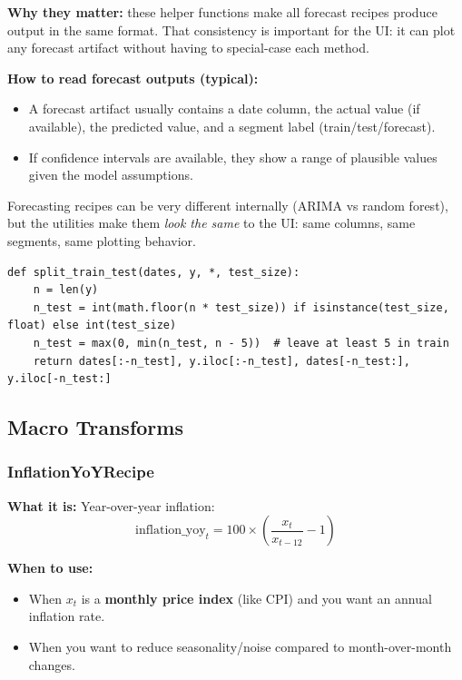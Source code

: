 \documentclass[11pt,a4paper]{article}
\begin{document}
\textbf{Why they matter:} these helper functions make all forecast recipes produce output in the same format. That consistency is important for the UI: it can plot any forecast artifact without having to special-case each method.

\textbf{How to read forecast outputs (typical):}
\begin{itemize}[leftmargin=2em]
  \item A forecast artifact usually contains a date column, the actual value (if available), the predicted value, and a segment label (train/test/forecast).
  \item If confidence intervals are available, they show a range of plausible values given the model assumptions.
\end{itemize}

\begin{intuitionbox}
Forecasting recipes can be very different internally (ARIMA vs random forest), but the utilities make them \textit{look the same} to the UI: same columns, same segments, same plotting behavior.
\end{intuitionbox}

\begin{lstlisting}
def split_train_test(dates, y, *, test_size):
    n = len(y)
    n_test = int(math.floor(n * test_size)) if isinstance(test_size, float) else int(test_size)
    n_test = max(0, min(n_test, n - 5))  # leave at least 5 in train
    return dates[:-n_test], y.iloc[:-n_test], dates[-n_test:], y.iloc[-n_test:]
\end{lstlisting}

\subsection{Macro Transforms}

\subsubsection{InflationYoYRecipe}\label{sec:inflation-yoy}

\textbf{What it is:} Year-over-year inflation:
\[
\text{inflation\_yoy}_t = 100 \times \left( \frac{x_t}{x_{t-12}} - 1 \right)
\]

\textbf{When to use:}
\begin{itemize}[leftmargin=2em]
  \item When \(x_t\) is a \textbf{monthly price index} (like CPI) and you want an annual inflation rate.
  \item When you want to reduce seasonality/noise compared to month-over-month changes.
\end{itemize}
\end{document}
